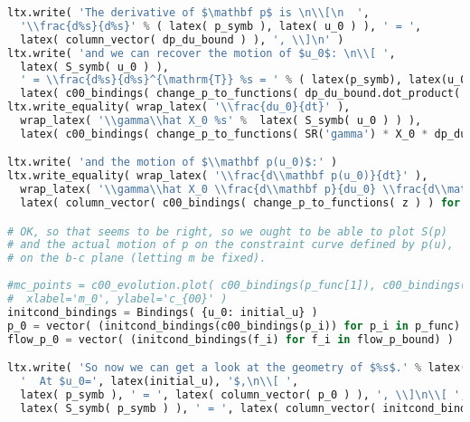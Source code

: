 \begin{lstlisting}[language=Python]
ltx.write( 'The derivative of $\mathbf p$ is \n\\[\n  ',
  '\\frac{d%s}{d%s}' % ( latex( p_symb ), latex( u_0 ) ), ' = ',
  latex( column_vector( dp_du_bound ) ), ', \\]\n' )
ltx.write( 'and we can recover the motion of $u_0$: \n\\[ ',
  latex( S_symb( u_0 ) ),
  ' = \\frac{d%s}{d%s}^{\mathrm{T}} %s = ' % ( latex(p_symb), latex(u_0), latex( S_symb( pf_symb( u_0 ) ) ) ),
  latex( c00_bindings( change_p_to_functions( dp_du_bound.dot_product( S_p ) ) ) ), ' \\]\n' )
ltx.write_equality( wrap_latex( '\\frac{du_0}{dt}' ),
  wrap_latex( '\\gamma\\hat X_0 %s' %  latex( S_symb( u_0 ) ) ),
  latex( c00_bindings( change_p_to_functions( SR('gamma') * X_0 * dp_du_bound.dot_product( S_p ) ) ) ) )

ltx.write( 'and the motion of $\\mathbf p(u_0)$:' )
ltx.write_equality( wrap_latex( '\\frac{d\\mathbf p(u_0)}{dt}' ),
  wrap_latex( '\\gamma\\hat X_0 \\frac{d\\mathbf p}{du_0} \\frac{d\\mathbf p}{du_0}^{\\mathrm{T}} %s' %  latex( S_symb( pf_symb( u_0 ) ) ) ),
  latex( column_vector( c00_bindings( change_p_to_functions( z ) ) for z in SR('gamma') * X_0 * dp_du_bound * dp_du_bound.dot_product( S_p ) ) ) );

# OK, so that seems to be right, so we ought to be able to plot S(p)
# and the actual motion of p on the constraint curve defined by p(u),
# on the b-c plane (letting m be fixed).
 
#mc_points = c00_evolution.plot( c00_bindings(p_func[1]), c00_bindings(p_func[2]),
#  xlabel='m_0', ylabel='c_{00}' )
initcond_bindings = Bindings( {u_0: initial_u} )
p_0 = vector( (initcond_bindings(c00_bindings(p_i)) for p_i in p_func) )
flow_p_0 = vector( (initcond_bindings(f_i) for f_i in flow_p_bound) )

ltx.write( 'So now we can get a look at the geometry of $%s$.' % latex( p_symb ),
  '  At $u_0=', latex(initial_u), '$,\n\\[ ',
  latex( p_symb ), ' = ', latex( column_vector( p_0 ) ), ', \\]\n\\[ ',
  latex( S_symb( p_symb ) ), ' = ', latex( column_vector( initcond_bindings( c00_bindings( change_p_to_functions( si ) ) ) for si in S_p ) ), ' \\]\n' )


\end{lstlisting}

